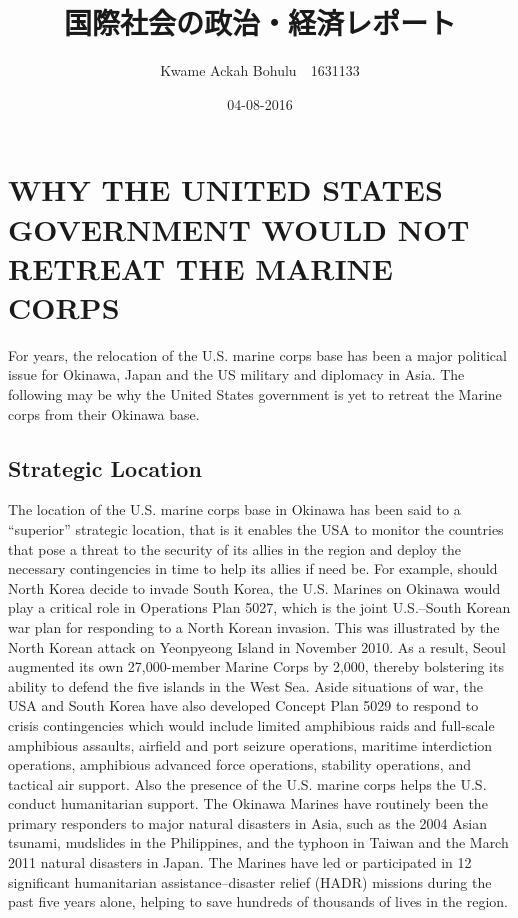 \documentclass[24 pts]{article}
\title{国際社会の政治・経済レポート	 }
\date{04-08-2016}
\author{Kwame Ackah Bohulu　1631133}
\begin{document}
\maketitle
\section{WHY THE UNITED STATES GOVERNMENT WOULD NOT RETREAT THE MARINE CORPS}
For years, the relocation of the U.S. marine corps base has been a major political issue for Okinawa, Japan and the US military and diplomacy in Asia. The following may be why the United States government is yet to retreat the Marine corps from their Okinawa base.
\subsection{Strategic Location}
The location of the U.S. marine corps base in Okinawa has been said to a “superior” strategic location, that is it enables the USA to monitor the countries that pose a threat to the security of its allies in the region and deploy the necessary contingencies in time to help its allies if need be. For example, should North Korea decide to invade South Korea, the U.S. Marines on Okinawa would play a critical role in Operations Plan 5027, which is the joint U.S.–South Korean war plan for responding to a North Korean invasion. This was illustrated by the North Korean attack on Yeonpyeong Island in November 2010. As a result, Seoul augmented its own 27,000-member Marine Corps by 2,000, thereby bolstering its ability to defend the five islands in the West Sea. 
Aside situations of war, the USA and South Korea have also developed Concept Plan 5029 to respond to crisis contingencies which would include limited amphibious raids and full-scale amphibious assaults, airfield and port seizure operations, maritime interdiction operations, amphibious advanced force operations, stability operations, and tactical air support. 
Also the presence of the U.S. marine corps helps the U.S. conduct humanitarian support. The Okinawa Marines have routinely been the primary responders to major natural disasters in Asia, such as the 2004 Asian tsunami, mudslides in the Philippines, and the typhoon in Taiwan and the March 2011 natural disasters in Japan. The Marines have led or participated in 12 significant humanitarian assistance–disaster relief (HADR) missions during the past five years alone, helping to save hundreds of thousands of lives in the region.
\end{document}
